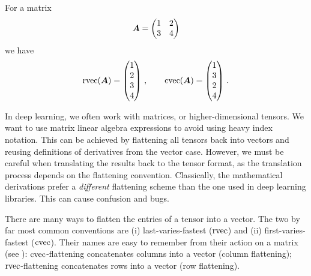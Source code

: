 \switchcolumn[1]
\begin{example}\label{ex:flattening}
  For a matrix
  \begin{equation*}
    {\bm{A}} = \begin{pmatrix} 1 & 2 \\ 3 & 4 \end{pmatrix}
  \end{equation*}
  we have
  \begin{equation*}
    \operatorname{rvec}({\bm{A}})
    =
    \begin{pmatrix}
      1 \\ 2 \\ 3 \\ 4
    \end{pmatrix}\,,
    \qquad
    \operatorname{cvec}({\bm{A}})
    =
    \begin{pmatrix}
      1 \\ 3 \\ 2 \\ 4
    \end{pmatrix}\,.
  \end{equation*}
\end{example}
\switchcolumn[0]

\vspace{\baselineskip}
\begin{caveat}[Flattening]
  In deep learning, we often work with matrices, or higher-dimensional tensors.
  We want to use matrix linear algebra expressions to avoid using heavy index notation.
  This can be achieved by flattening all tensors back into vectors and reusing definitions of derivatives from the vector case.
  However, we must be careful when translating the results back to the tensor format, as the translation process depends on the flattening convention.
  Classically, the mathematical derivations prefer a \emph{different} flattening scheme than the one used in deep learning libraries.
  This can cause confusion and bugs.
\end{caveat}

\switchcolumn[1]
\switchcolumn[0]

There are many ways to flatten the entries of a tensor into a vector.
The two by far most common conventions are (i) last-varies-fastest ($\operatorname{rvec}$) and (ii) first-varies-fastest ($\operatorname{cvec}$).
Their names are easy to remember from their action on a matrix (see ): $\operatorname{cvec}$-flattening concatenates columns into a vector (column flattening); $\operatorname{rvec}$-flattening concatenates rows into a vector (row flattening).

